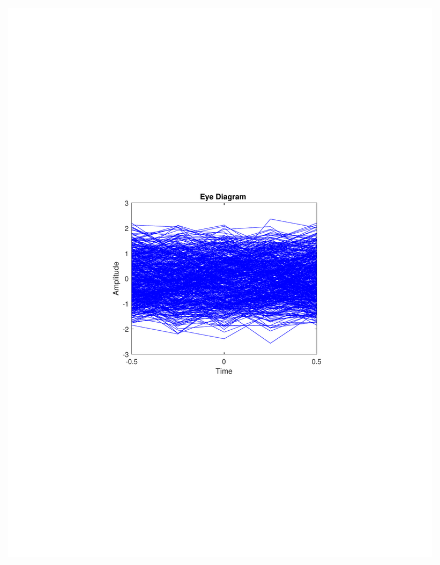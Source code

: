 \begin{refsection}
\begin{figure}[H]
\begin{minipage}{0.30\textwidth}
		\includegraphics[clip, trim=4cm 8cm 4cm 8cm, width=1\textwidth]{./sdf/m_qam_system/figures/expResults/homodyne/1_eye_4GBdInSig13dB_AfFec.pdf}
		\label{fig:4GBdSpecAftFec}
	\end{minipage}
	\begin{minipage}{0.30\textwidth}
		\centering

\end{minipage}
\end{figure}
\end{refsection}

